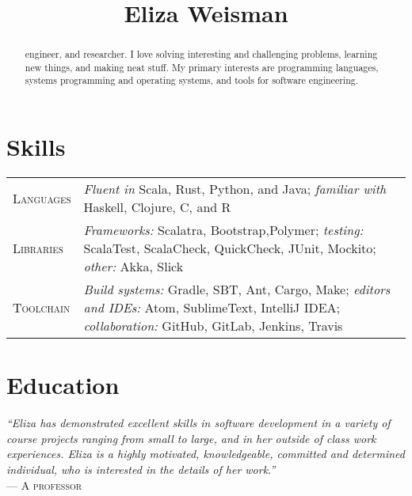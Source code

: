 \documentclass[a4paper]{tufte-handout}
\title{Eliza Weisman}
\date{}
\begin{document}
\maketitle


\begin{abstract}
\noindent
{} engineer, and researcher. I love solving interesting and challenging problems, learning new things, and making neat stuff. My primary interests are programming languages, systems programming and operating systems, and tools for software engineering.
\end{abstract}

\section{Skills}
\begin{fullwidth}
\noindent
\begin{tabular}{ l p{12.5cm} }
\textsc{Languages} & \emph{Fluent in} Scala, Rust, Python, and Java; \emph{familiar with} Haskell, Clojure, C, and R \\
\textsc{Libraries} & \emph{Frameworks:} Scalatra, Bootstrap,Polymer; \emph{testing:} ScalaTest, ScalaCheck, QuickCheck, JUnit, Mockito; \emph{other:} Akka, Slick \\
\textsc{Toolchain} & \emph{Build systems:} Gradle, SBT, Ant, Cargo, Make; \emph{editors and IDEs:} Atom, SublimeText, IntelliJ IDEA; \emph{collaboration:} GitHub, GitLab, Jenkins, Travis
\end{tabular}
\end{fullwidth}

\section{Education}
\begin{blockquote}
    {\footnotesize
    \emph{``Eliza has demonstrated excellent skills in software development in a variety of course projects ranging from small to large, and in her outside of class work experiences. Eliza is a highly motivated, knowledgeable, committed and determined individual, who is interested in the details of her work.''}\\
--- \textsc{A professor}}
\end{blockquote}
\end{document}

